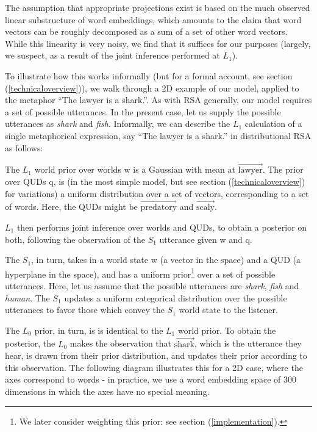 \documentclass[10pt,letterpaper,twocolumn]{article}
\begin{document}
The assumption that appropriate projections exist is based on the much observed linear substructure of word embeddings, which amounts to the claim that word vectors can be roughly decomposed as a sum of a set of other word vectors. While this linearity is very noisy, we find that it suffices for our purposes (largely, we suspect, as a result of the joint inference performed at $L_1$).

To illustrate how this works informally (but for a formal account, see section (\ref{technicaloverview})), we walk through a 2D example of our model, applied to the metaphor ``The lawyer is a shark.''. As with RSA generally, our model requires a set of possible utterances. In the present case, let us supply the possible utterances as \emph{shark} and \emph{fish}. Informally, we can describe the $L_1$ calculation of a single metaphorical expression, say ``The lawyer is a shark.'' in distributional RSA as follows:

The $L_1$ world prior over worlds w is a Gaussian with mean at $\overrightarrow{\text{lawyer}}$. The prior over QUDs q, is (in the most simple model, but see section (\ref{technicaloverview}) for variations) a uniform distribution over a set of vectors, corresponding to a set of words. Here, the QUDs might be $\overrightarrow{\text{predatory}}$ and $\overrightarrow{\text{scaly}}$.

$L_1$ then performs joint inference over worlds and QUDs, to obtain a posterior on both, following the observation of the $S_1$ utterance given w and q.

The $S_1$, in turn, takes in a world state w (a vector in the space) and a QUD (a hyperplane in the space), and has a uniform prior\footnote{We later consider weighting this prior: see section (\ref{implementation}).} over a set of possible utterances. Here, let us assume that the possible utterances are \emph{shark}, \emph{fish} and \emph{human}. The $S_1$ updates a uniform categorical distribution over the possible utterances to favor those which convey the $S_1$ world state to the listener.


The $L_0$ prior, in turn, is is identical to the $L_1$ world prior. To obtain the posterior, the $L_0$ makes the observation that $\overrightarrow{\text{shark}}$, which is the utterance they hear, is drawn from their prior distribution, and updates their prior according to this observation. The following diagram illustrates this for a 2D case, where the axes correspond to words - in practice, we use a word embedding space of 300 dimensions in which the axes have no special meaning.
\end{document}
